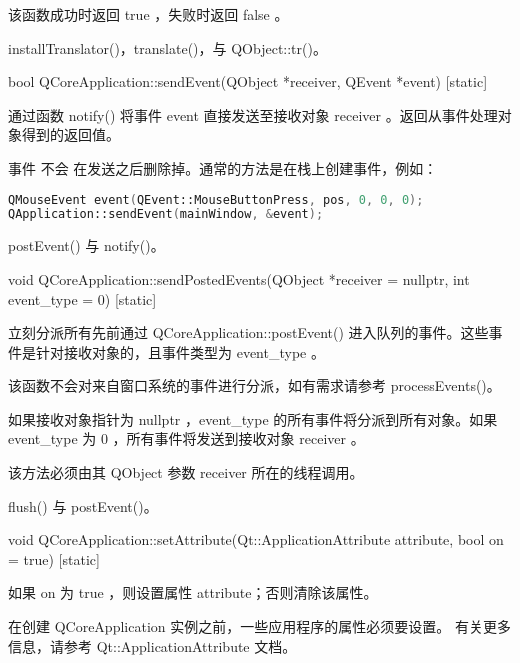 该函数成功时返回 true ，失败时返回 false 。


\begin{notice}[另请参阅]
installTranslator()，translate()，与 QObject::tr()。
\end{notice}

bool QCoreApplication::sendEvent(QObject *receiver, QEvent *event) [static]

通过函数 notify() 将事件 event 直接发送至接收对象 receiver 。返回从事件处理对象得到的返回值。

事件 不会 在发送之后删除掉。通常的方法是在栈上创建事件，例如：

\begin{lstlisting}[language=C++]
QMouseEvent event(QEvent::MouseButtonPress, pos, 0, 0, 0);
QApplication::sendEvent(mainWindow, &event);
\end{lstlisting}



\begin{notice}[另请参阅]
postEvent() 与 notify()。
\end{notice}

void QCoreApplication::sendPostedEvents(QObject *receiver = nullptr, int event\_type = 0) [static]

立刻分派所有先前通过 QCoreApplication::postEvent() 进入队列的事件。这些事件是针对接收对象的，且事件类型为 event\_type 。

该函数不会对来自窗口系统的事件进行分派，如有需求请参考 processEvents()。

如果接收对象指针为 nullptr ，event\_type 的所有事件将分派到所有对象。如果 event\_type 为 0 ，所有事件将发送到接收对象 receiver 。


\begin{notice}
该方法必须由其 QObject 参数 receiver 所在的线程调用。

\end{notice}


\begin{notice}[另请参阅]
flush() 与 postEvent()。
\end{notice}


void QCoreApplication::setAttribute(Qt::ApplicationAttribute attribute, bool on = true) [static]

如果 on 为 true ，则设置属性 attribute；否则清除该属性。



\begin{notice}
在创建 QCoreApplication 实例之前，一些应用程序的属性必须要设置。 有关更多信息，请参考 Qt::ApplicationAttribute 文档。
\end{notice}


